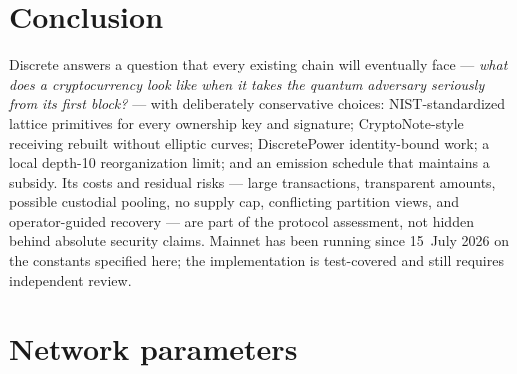 \documentclass[11pt,a4paper]{article}
\begin{document}
\section{Conclusion}

Discrete answers a question that every existing chain will eventually face
--- \emph{what does a cryptocurrency look like when it takes the quantum
adversary seriously from its first block?} --- with deliberately conservative
choices: NIST-standardized lattice primitives for every ownership key and
signature; CryptoNote-style receiving rebuilt without elliptic curves;
DiscretePower identity-bound work; a local depth-10 reorganization limit; and an
emission schedule that maintains a subsidy. Its costs and residual risks ---
large transactions, transparent amounts, possible custodial pooling, no supply
cap, conflicting partition views, and operator-guided recovery --- are part of
the protocol assessment, not hidden behind absolute security claims. Mainnet has
been running since 15~July 2026 on the constants specified here; the
implementation is test-covered and still requires independent review.

\appendix

\section{Network parameters}\label{app:params}
\end{document}
